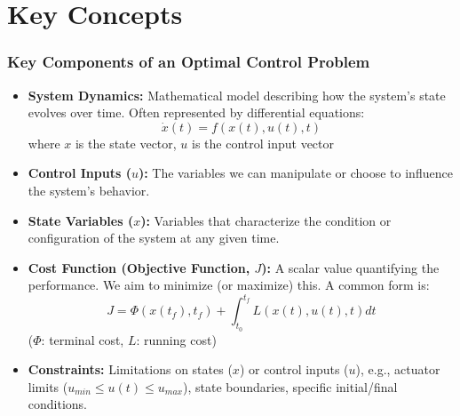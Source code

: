 \documentclass{beamer}
\begin{document}
\section{Key Concepts}
\begin{frame}
\frametitle{Key Components of an Optimal Control Problem}
    \begin{itemize}
        \item \textbf{System Dynamics:} Mathematical model describing how the system's state evolves over time. Often represented by differential equations:
        $$ \dot{x}(t) = f(x(t), u(t), t) $$
        where $x$ is the state vector, $u$ is the control input vector

        \item \textbf{Control Inputs ($u$):} The variables we can manipulate or choose to influence the system's behavior.

        \item \textbf{State Variables ($x$):} Variables that characterize the condition or configuration of the system at any given time.

        \item \textbf{Cost Function (Objective Function, $J$):} A scalar value quantifying the performance. We aim to minimize (or maximize) this. A common form is:
        $$ J = \Phi(x(t_f), t_f) + \int_{t_0}^{t_f} L(x(t), u(t), t) dt $$
        ($\Phi$: terminal cost, $L$: running cost)

        \item \textbf{Constraints:} Limitations on states ($x$) or control inputs ($u$), e.g., actuator limits ($u_{min} \le u(t) \le u_{max}$), state boundaries, specific initial/final conditions.
    \end{itemize}
\end{frame}
\end{document}

